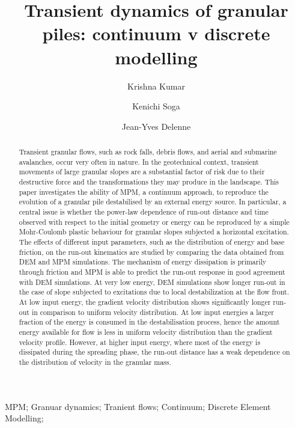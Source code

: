 \documentclass[3p,times,procedia,number]{elsarticle}
\begin{document}
\begin{frontmatter}



\title{Transient dynamics of granular piles: continuum v discrete modelling}

\author[a]{Krishna Kumar}
\author[a,b]{Kenichi Soga}
\author[c]{Jean-Yves Delenne}

\address[a]{Department of Engineering, University of Cambridge, Cambridge CB2
  1PZ, UK}
\address[b]{Department of Civil Engineering, University of California,
  Berkeley, USA}
\address[c]{University of Montpellier II, France}

\begin{abstract}
Transient granular flows, such as rock falls, debris flows, and aerial and
submarine avalanches, occur very often in nature. In the geotechnical
context, transient movements of large granular slopes are a substantial
factor of risk due to their destructive force and the transformations they
may produce in the landscape. This paper investigates the ability of MPM, a
continuum approach, to reproduce the evolution of a granular pile
destabilised by an external energy source. In particular, a central issue is
whether the power-law dependence of run-out distance and time observed with
respect to the initial geometry or energy can be reproduced by a simple
Mohr-Coulomb plastic behaviour for granular slopes subjected a horizontal
excitation. The effects of different input parameters, such as the
distribution of energy and base friction, on the run-out kinematics are
studied by comparing the data obtained from DEM and MPM simulations. The
mechanism of energy dissipation is primarily through friction and MPM is able
to predict the run-out response in good agreement with DEM simulations. At
very low energy, DEM simulations show longer run-out in the case of slope
subjected to excitations due to local destabilization at the flow front. At
low input energy, the gradient velocity distribution shows significantly
longer run-out in comparison to uniform velocity distribution. At low input
energies a larger fraction of the energy is consumed in the destabilisation
process, hence the amount energy available for flow is less in uniform
velocity distribution than the gradient velocity profile. However, at higher
input energy, where most of the energy is dissipated during the spreading
phase, the run-out distance has a weak dependence on the distribution of
velocity in the granular mass.
\end{abstract}

\begin{keyword}
MPM; Granuar dynamics; Tranient flows; Continuum; 
Discrete Element Modelling;



\end{keyword}
\end{frontmatter}
\end{document}
